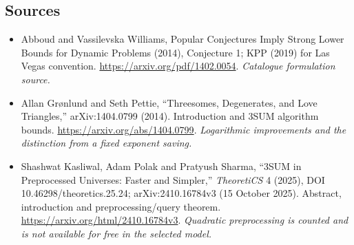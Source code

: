 \documentclass[11pt,a4paper]{article}
\numberwithin{equation}{section}
\begin{document}
\subsection{Sources}
\begin{itemize}\raggedright
\item[\textnormal{[S1]}]\hypertarget{source:161:1}{} Abboud and Vassilevska Williams, Popular Conjectures Imply Strong Lower Bounds for Dynamic Problems (2014), Conjecture 1; KPP (2019) for Las Vegas convention.
\url{https://arxiv.org/pdf/1402.0054}.
{\small\textit{Catalogue formulation source.}}
\item[\textnormal{[E1]}]\hypertarget{extra:161:1}{} Allan Gr\o nlund and Seth Pettie, ``Threesomes, Degenerates, and Love Triangles,'' arXiv:1404.0799 (2014). Introduction and 3SUM algorithm bounds.
\url{https://arxiv.org/abs/1404.0799}.
{\small\textit{Logarithmic improvements and the distinction from a fixed exponent saving.}}
\item[\textnormal{[E2]}]\hypertarget{extra:161:2}{} Shashwat Kasliwal, Adam Polak and Pratyush Sharma, ``3SUM in Preprocessed Universes: Faster and Simpler,'' \emph{TheoretiCS} 4 (2025), DOI 10.46298/theoretics.25.24; arXiv:2410.16784v3 (15 October 2025). Abstract, introduction and preprocessing/query theorem.
\url{https://arxiv.org/html/2410.16784v3}.
{\small\textit{Quadratic preprocessing is counted and is not available for free in the selected model.}}
\end{itemize}
\end{document}
